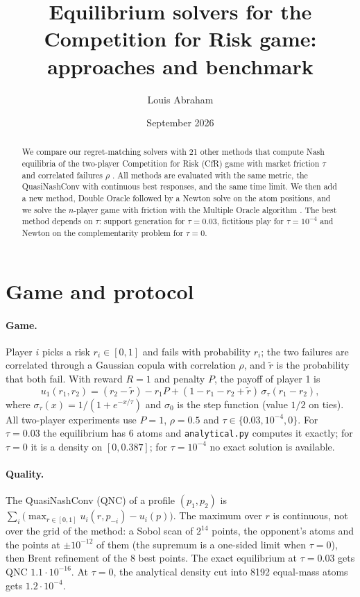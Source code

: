 \documentclass[10pt,a4paper]{article}
\title{Equilibrium solvers for the Competition for Risk game:\\ approaches and benchmark}
\author{Louis Abraham}
\date{September 2026}
\begin{document}
\maketitle

\begin{abstract}
We compare our regret-matching solvers with 21 other methods that compute Nash equilibria of the
two-player Competition for Risk (CfR) game with market friction $\tau$ and correlated failures
$\rho$ \cite{abraham2023}. All methods are evaluated with the same metric, the QuasiNashConv with
continuous best responses, and the same time limit. We then add a new method, Double Oracle
followed by a Newton solve on the atom positions, and we solve the $n$-player game with friction
with the Multiple Oracle algorithm \cite{kroupa2021}. The best method depends on $\tau$: support
generation for $\tau=0.03$, fictitious play for $\tau=10^{-4}$ and Newton on the complementarity
problem for $\tau=0$.
\end{abstract}

\section{Game and protocol}

\paragraph{Game.} Player $i$ picks a risk $r_i\in[0,1]$ and fails with probability $r_i$; the two
failures are correlated through a Gaussian copula with correlation $\rho$, and $\tilde r$ is the
probability that both fail. With reward $R=1$ and penalty $P$, the payoff of player 1 is
\[
u_1(r_1,r_2) = (r_2-\tilde r) - r_1 P + (1-r_1-r_2+\tilde r)\,\sigma_\tau(r_1-r_2),
\]
where $\sigma_\tau(x)=1/(1+e^{-x/\tau})$ and $\sigma_0$ is the step function (value $1/2$ on
ties). All two-player experiments use $P=1$, $\rho=0.5$ and $\tau\in\{0.03, 10^{-4}, 0\}$. For
$\tau=0.03$ the equilibrium has 6 atoms and \texttt{analytical.py} computes it exactly; for
$\tau=0$ it is a density on $[0, 0.387]$; for $\tau=10^{-4}$ no exact solution is available.

\paragraph{Quality.} The QuasiNashConv (QNC) of a profile $(p_1,p_2)$ is
$\sum_i \big(\max_{r\in[0,1]} u_i(r, p_{-i}) - u_i(p)\big)$. The maximum over $r$ is continuous,
not over the grid of the method: a Sobol scan of $2^{14}$ points, the opponent's atoms and the
points at $\pm10^{-12}$ of them (the supremum is a one-sided limit when $\tau=0$), then Brent
refinement of the 8 best points. The exact equilibrium at $\tau=0.03$ gets QNC $1.1\cdot10^{-16}$.
At $\tau=0$, the analytical density cut into 8192 equal-mass atoms gets $1.2\cdot10^{-4}$.
\end{document}
